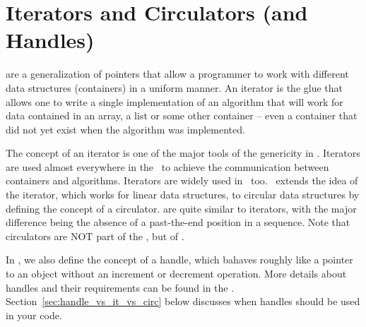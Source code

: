 
\chapter{Iterators and Circulators (and Handles)\label{chap:iterators_and_circulators}}
\ccIndexMainItemBegin{\stl} 


are a generalization of pointers that allow a programmer to work 
with different data structures (containers) in a uniform manner. 
An iterator is the glue that allows one to write a single implementation of 
an algorithm that will work for data contained in an array, a list or some 
other container -- even a container that did not yet exist when the algorithm 
was implemented. 

The concept of an iterator is one of the major tools of the genericity
in \stl.
Iterators are used almost everywhere in the \stl\  to
achieve the communication between containers and algorithms.
Iterators are widely used in \cgal\ too.
\cgal\ extends the idea of the iterator, which works for linear data
structures, to circular data structures by defining the concept of
a circulator.  
are quite similar to iterators, with the
major difference being the absence of a past-the-end position in a sequence.
Note that circulators are NOT part of the \stl, but of \cgal.

In \cgal, we also define the concept of a handle, 
which bahaves roughly
like a pointer to an object without an increment or decrement operation.
More details about handles and their requirements can be found in 
the . 
Section~\ref{sec:handle_vs_it_vs_circ} below discusses when handles
should be used in your code.

